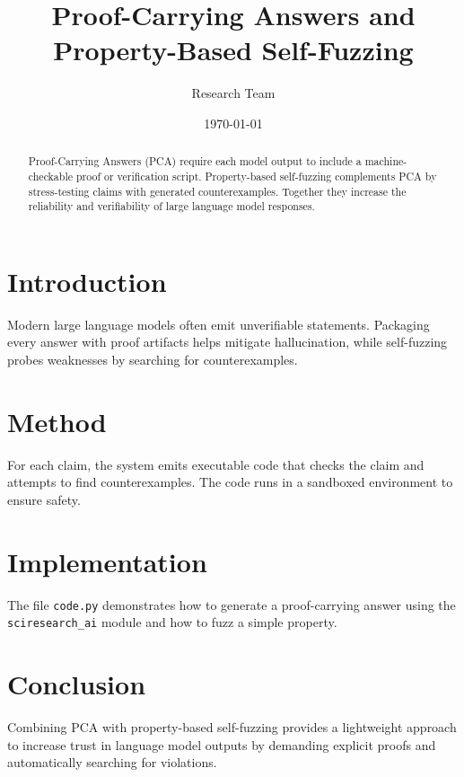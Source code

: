 \documentclass{article}
\title{Proof-Carrying Answers and Property-Based Self-Fuzzing}
\author{Research Team}
\date{\today}
\begin{document}
\maketitle

\begin{abstract}
Proof-Carrying Answers (PCA) require each model output to include a
machine-checkable proof or verification script. Property-based
self-fuzzing complements PCA by stress-testing claims with generated
counterexamples. Together they increase the reliability and
verifiability of large language model responses.
\end{abstract}

\section{Introduction}
Modern large language models often emit unverifiable statements.
Packaging every answer with proof artifacts helps mitigate
hallucination, while self-fuzzing probes weaknesses by searching for
counterexamples.

\section{Method}
For each claim, the system emits executable code that checks the claim
and attempts to find counterexamples. The code runs in a sandboxed
environment to ensure safety.

\section{Implementation}
The file \texttt{code.py} demonstrates how to generate a
proof-carrying answer using the \texttt{sciresearch\_ai} module and how
to fuzz a simple property.

\section{Conclusion}
Combining PCA with property-based self-fuzzing provides a lightweight
approach to increase trust in language model outputs by demanding
explicit proofs and automatically searching for violations.
\end{document}
